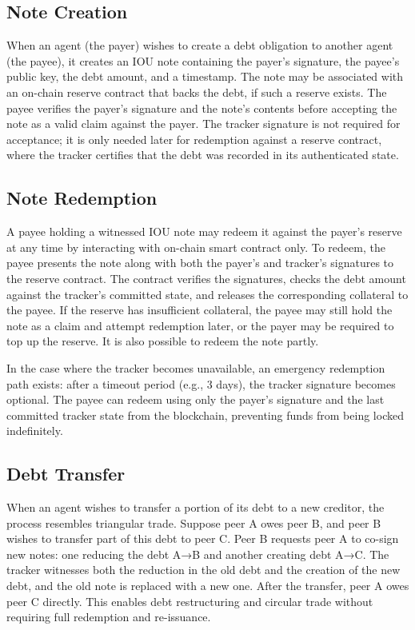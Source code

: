 \documentclass{ifcolog}
\begin{document}
\subsection{Note Creation}

When an agent (the payer) wishes to create a debt obligation to another agent (the payee), it creates an IOU note containing the payer's signature, the payee's public key, the debt amount, and a timestamp. The note may be associated with an on-chain reserve contract that backs the debt, if such a reserve exists. The payee verifies the payer's signature and the note's contents before accepting the note as a valid claim against the payer. The tracker signature is not required for acceptance; it is only needed later for redemption against a reserve contract, where the tracker certifies that the debt was recorded in its authenticated state.

\subsection{Note Redemption}

A payee holding a witnessed IOU note may redeem it against the payer's reserve at any time by interacting with on-chain smart contract only. To redeem, the payee presents the note along with both the payer's and tracker's signatures to the reserve contract. The contract verifies the signatures, checks the debt amount against the tracker's committed state, and releases the corresponding collateral to the payee. If the reserve has insufficient collateral, the payee may still hold the note as a claim and attempt redemption later, or the payer may be required to top up the reserve. It is also possible to redeem the note partly.

In the case where the tracker becomes unavailable, an emergency redemption path exists: after a timeout period (e.g., 3 days), the tracker signature becomes optional. The payee can redeem using only the payer's signature and the last committed tracker state from the blockchain, preventing funds from being locked indefinitely.

\subsection{Debt Transfer}

When an agent wishes to transfer a portion of its debt to a new creditor, the process resembles triangular trade. Suppose peer A owes peer B, and peer B wishes to transfer part of this debt to peer C. Peer B requests peer A to co-sign new notes: one reducing the debt A→B and another creating debt A→C. The tracker witnesses both the reduction in the old debt and the creation of the new debt, and the old note is replaced with a new one. After the transfer, peer A owes peer C directly. This enables debt restructuring and circular trade without requiring full redemption and re-issuance.
\end{document}
